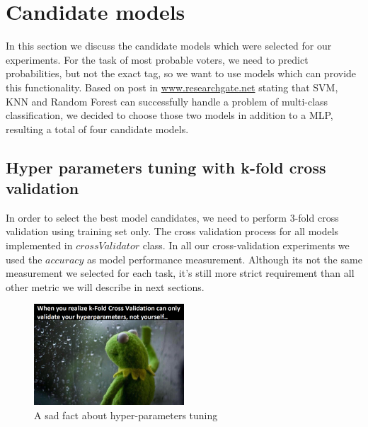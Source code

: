 \documentclass[12pt]{article}
\begin{document}
\newpage
\section{Candidate models}
In this section we discuss the candidate models which were selected for our experiments. For the task of most probable voters, we need to predict probabilities, but not the exact tag, so we want to use models which can provide this functionality. Based on post in \href{https://www.researchgate.net/post/What_are_the_best_supervised_classifiers_to_classify_the_problem_of_multiclass_classification}{www.researchgate.net} stating that SVM, KNN and Random Forest can successfully handle a problem of multi-class classification, we decided to choose those two models in addition to a MLP, resulting a total of four candidate models.

\subsection{Hyper parameters tuning with k-fold cross validation}
In order to select the best model candidates, we need to perform 3-fold cross validation using training set only. The cross validation process for all models implemented in $crossValidator$ class. In all our cross-validation experiments we used the $accuracy$ as model performance measurement. Although its not the same measurement we selected for each task, it's still more strict requirement than all other metric we will describe in next sections.

\begin{figure}[h]
\centering
\includegraphics[width=0.5\textwidth]{report_pics/frog}
\caption{A sad fact about hyper-parameters tuning}
\end{figure}

\newpage
\end{document}
